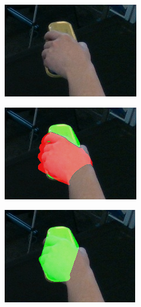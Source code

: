 \begin{figure}[h!]
    \begin{subfigure}[b]{0.32\linewidth}
        \includegraphics[width=0.98\linewidth]{figs/20020_rgb}
        \caption{}
    \end{subfigure}
    \begin{subfigure}[b]{0.32\linewidth}
        \includegraphics[width=0.98\linewidth]{figs/20020_withhand}
        \caption{}
    \end{subfigure}
    \begin{subfigure}[b]{0.32\linewidth}
        \includegraphics[width=0.98\linewidth]{figs/20020_nohand}

\end{subfigure}
\end{figure}
